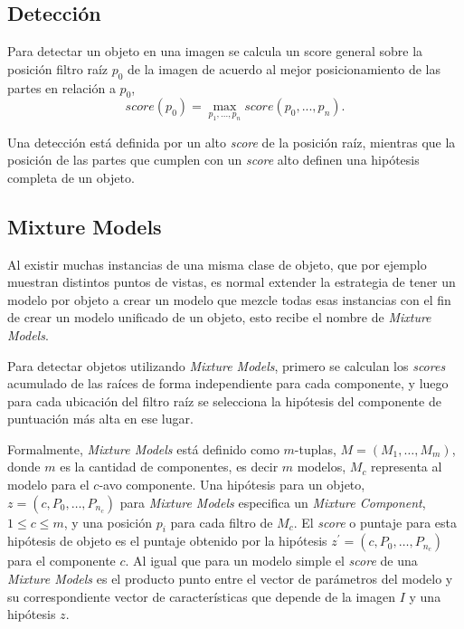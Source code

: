 \subsection{Detección}\label{subsec:detection}
Para detectar un objeto en una imagen se calcula un score general sobre la posición filtro raíz $p_0$ de la imagen de acuerdo al mejor posicionamiento de las partes en relación a $p_0$,
\begin{equation}	\label{max_score}
	\mathit{score}(p_{0}) = \max_{p_{1}, ..., p_{n}} \mathit{score}(p_{0}, ..., p_{n}).
\end{equation}

Una detección está definida por un alto \textit{score} de la posición raíz, mientras que  la posición de las partes que cumplen con un \textit{score} alto definen una hipótesis completa de un objeto.

\subsection{Mixture Models}\label{subsec:m_models}
Al existir muchas instancias de una misma clase de objeto, que por ejemplo muestran distintos puntos de vistas, es normal extender la estrategia de tener un modelo por objeto a crear un modelo que mezcle todas esas instancias con el fin de crear un modelo unificado de un objeto, esto recibe el nombre de \textit{Mixture Models}.

Para detectar objetos utilizando \textit{Mixture Models}, primero se calculan los \textit{scores} acumulado de las raíces de forma independiente para cada componente, y luego para cada ubicación del filtro raíz se selecciona la hipótesis del componente de puntuación más alta en ese lugar.

Formalmente, \textit{Mixture Models} está definido como $m$-tuplas, $M = (M_1, \dots, M_m)$, donde $m$ es la cantidad de componentes, es decir $m$ modelos, $M_c$ representa al modelo para el $c$-avo componente. Una hipótesis para un objeto, $z = (c, P_0, \dots, P_{n_c})$ para \textit{Mixture Models} especifica un \textit{Mixture Component}, $1 \leq c \leq m$, y una posición $p_i$ para cada filtro de $M_c$. El \textit{score} o puntaje para esta hipótesis de objeto es el puntaje obtenido por la hipótesis $z^{\prime} = (c, P_0, \dots, P_{n_c})$ para el componente $c$. Al igual que para un modelo simple el \textit{score} de una \textit{Mixture Models} es el producto punto entre el vector de parámetros del modelo y su correspondiente vector de características que depende de la imagen $I$ y una hipótesis $z$.

